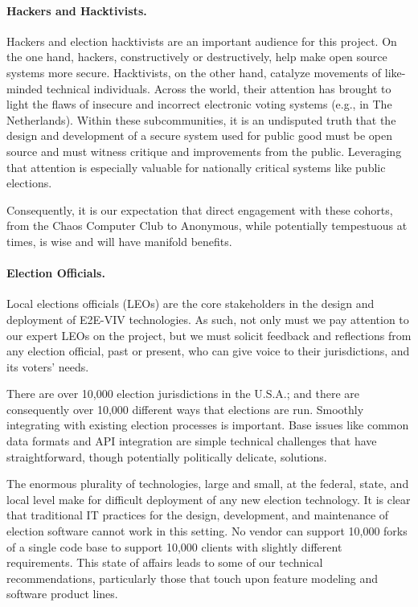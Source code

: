 \paragraph{Hackers and Hacktivists.} Hackers and election hacktivists
are an important audience for this project. On the one hand, hackers,
constructively or destructively, help make open source systems more
secure.  Hacktivists, on the other hand, catalyze movements of
like-minded technical individuals. Across the world, their attention
has brought to light the flaws of insecure and incorrect electronic
voting systems (e.g., in The Netherlands).
Within these subcommunities, it is an undisputed truth that the design
and development of a secure system used for public good must be open
source and must witness critique and improvements from the public.
Leveraging that attention is especially valuable for nationally
critical systems like public elections.

Consequently, it is our expectation that direct engagement with these
cohorts, from the Chaos Computer Club to Anonymous, while potentially
tempestuous at times, is wise and will have manifold benefits.

\paragraph{Election Officials.} Local elections officials (LEOs) are
the core stakeholders in the design and deployment of E2E-VIV
technologies.  As such, not only must we pay attention to our expert
LEOs on the project, but we must solicit feedback and reflections from
any election official, past or present, who can give voice to their
jurisdictions, and its voters' needs.

There are over 10,000 election jurisdictions in the U.S.A.; and there
are consequently over 10,000 different ways that elections are
run. Smoothly integrating with existing election processes is
important. Base issues like common data formats and API integration
are simple technical challenges that have straightforward, though
potentially politically delicate, solutions.

The enormous plurality of technologies, large and small, at the
federal, state, and local level make for difficult deployment of any
new election technology. It is clear that traditional IT practices for
the design, development, and maintenance of election software cannot
work in this setting. No vendor can support 10,000 forks of a single
code base to support 10,000 clients with slightly different
requirements. This state of affairs leads to some of our technical
recommendations, particularly those that touch upon feature modeling
and software product lines.

